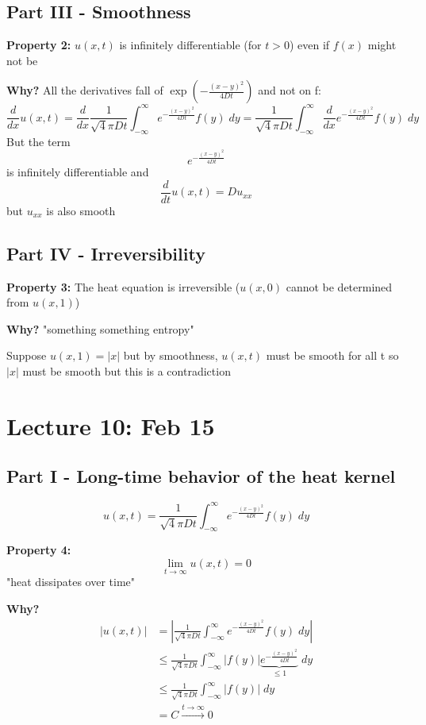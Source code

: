 \documentclass[12pt]{article}
\begin{document}
\subsection*{Part III  - Smoothness}
\textbf{Property 2:} $u(x, t)$ is infinitely differentiable (for $t >0$) even if $f(x)$ might not be 

\textbf{Why?}
All the derivatives fall of $\exp(-\frac{(x-y)^2}{4Dt})$ and not on f:
\[\frac{d}{dx} u(x, t) = \frac{d}{dx} \frac{1}{\sqrt4\pi D t} \int_{-\infty}^\infty e^{-\frac{(x - y)^2}{4Dt}} f(y) \; dy = \frac{1}{\sqrt4\pi D t} \int_{-\infty}^\infty \frac{d}{dx} e^{-\frac{(x - y)^2}{4Dt}} f(y) \; dy\]
But the term 
\[e^{-\frac{(x - y)^2}{4Dt}}\]
is infinitely differentiable and 
\[\frac{d}{dt}u(x, t) = Du_{xx}\]
but $u_{xx}$ is also smooth 

\subsection*{Part IV - Irreversibility}
\textbf{Property 3:} The heat equation is irreversible ($u(x, 0)$ cannot be determined from $u(x, 1)$)

\textbf{Why?}
"something something entropy"

Suppose $u(x, 1) = |x|$ but by smoothness, $u(x, t)$ must be smooth for all t so $|x|$ must be smooth but this is a contradiction

\section{Lecture 10: Feb 15}
\subsection*{Part I - Long-time behavior of the heat kernel}
\[u(x, t) = \frac{1}{\sqrt4\pi D t} \int_{-\infty}^\infty e^{-\frac{(x - y)^2}{4Dt}} f(y) \; dy\]

\textbf{Property 4:} 
\[\lim_{t \to \infty} u(x, t) = 0\]
"heat dissipates over time"

\textbf{Why?}
\begin{align*}
    |u(x, t)| &= \left|\frac{1}{\sqrt4\pi D t} \int_{-\infty}^\infty e^{-\frac{(x - y)^2}{4Dt}} f(y) \; dy\right|\\
    &\leq \frac{1}{\sqrt4\pi D t} \int_{-\infty}^\infty |f(y)| \underbrace{e^{-\frac{(x - y)^2}{4Dt}}}_{\leq 1} \; dy\\
    &\leq \frac{1}{\sqrt4\pi D t} \int_{-\infty}^\infty |f(y)| \; dy\\
    &= C \overset{t \to \infty}{\longrightarrow} 0
\end{align*}
\end{document}
